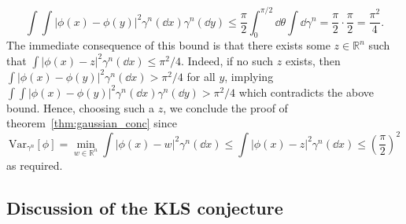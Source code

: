 \[\int \int |\phi(x) - \phi(y)|^2 \gamma^n(\dd x) \gamma^n(\dd y) 
  \le \frac{\pi}{2}\int_0^{\pi / 2} \dd \theta \int \dd \gamma^n
  = \frac{\pi}{2} \cdot \frac{\pi}{2} = \frac{\pi^2}{4}.\]
The immediate consequence of this bound is that there exists some \(z \in \mathbb{R}^n\) such that 
\(\int |\phi(x) - z|^2 \gamma^n(\dd x) \le \pi^2 / 4\). Indeed, if no such \(z\) exists, 
then \(\int |\phi(x) - \phi(y)|^2 \gamma^n(\dd x) > \pi^2 / 4\) for all \(y\), implying
\(\int \int |\phi(x) - \phi(y)|^2 \gamma^n(\dd x) \gamma^n(\dd y) > \pi^2 / 4\) which 
contradicts the above bound. Hence, choosing such a \(z\), we conclude the proof of 
theorem~\ref{thm:gaussian_conc} since
\[\text{Var}_{\gamma^n}[\phi] = \min_{w \in \mathbb{R}^n} \int |\phi(x) - w|^2 \gamma^n(\dd x)
  \le \int |\phi(x) - z|^2 \gamma^n(\dd x) \le \left(\frac{\pi}{2}\right)^2\]
as required.

\subsection{Discussion of the KLS conjecture}



